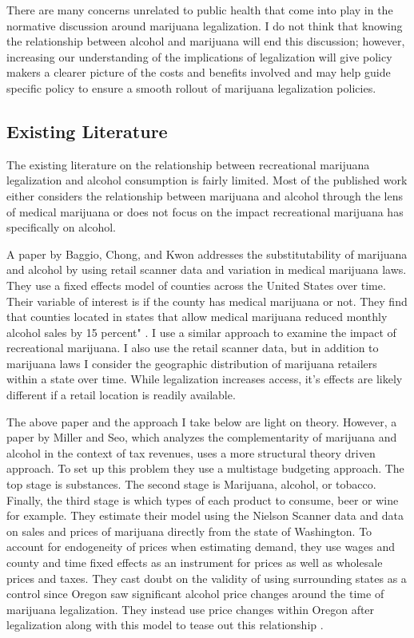 \documentclass[11pt]{article}
\begin{document}
There are many concerns unrelated to public health that come into play in the normative discussion around marijuana legalization. I do not think that knowing the relationship between alcohol and marijuana will end this discussion; however, increasing our understanding of the implications of legalization will give policy makers a clearer picture of the costs and benefits involved and may help guide specific policy to ensure a smooth rollout of marijuana legalization policies.




\subsection{Existing Literature}

The existing literature on the relationship between recreational marijuana legalization and alcohol consumption is fairly limited. Most of the published work either considers the relationship between marijuana and alcohol through the lens of medical marijuana or does not focus on the impact recreational marijuana has specifically on alcohol.\par 


A paper by Baggio, Chong, and Kwon addresses the substitutability of marijuana and alcohol by using retail scanner data and variation in medical marijuana laws. They use a fixed effects model of counties across the United States over time. Their variable of interest is if the county has medical marijuana or not. They find that counties located in states that allow medical marijuana reduced monthly alcohol sales by 15 percent" \cite{baggio_chong_kwon_2018}. I use a similar approach to examine the impact of recreational marijuana. I also use the retail scanner data, but in addition to marijuana laws I consider the geographic distribution of marijuana retailers within a state over time. While legalization increases access, it's effects are likely different if a retail location is readily available. \par


The above paper and the approach I take below are light on theory. However, a paper by Miller and Seo, which analyzes the complementarity of marijuana and alcohol in the context of tax revenues, uses a more structural theory driven approach. To set up this problem they use a multistage budgeting approach. The top stage is substances. The second stage is Marijuana, alcohol, or tobacco. Finally, the third stage is which types of each product to consume, beer or wine for example. They estimate their model using the Nielson Scanner data and data on sales and prices of marijuana directly from the state of Washington. To account for endogeneity of prices when estimating demand, they use wages and county and time fixed effects as an instrument for prices as well as wholesale prices and taxes.  They cast doubt on the validity of using surrounding states as a control since Oregon saw significant alcohol price changes around the time of marijuana legalization. They instead use price changes within Oregon after legalization along with this model to tease out this relationship \cite{miller_seo_2018}. \par
\end{document}
